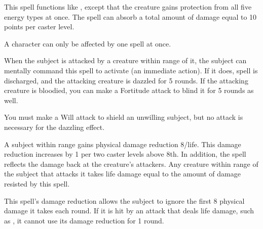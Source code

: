 \begin{spelleffect}
  This spell functions like , except that the creature gains protection from all five energy types at once. The spell can absorb a total amount of damage equal to 10 points per caster level.
\end{spelleffect}
\begin{spellnotes}
  A character can only be affected by one  spell at once.
\end{spellnotes}

\begin{spelleffect}
    When the subject is attacked by a creature within \rngclose range of it, the subject can mentally command this spell to activate (an immediate action). If it does, spell is discharged, and the attacking creature is dazzled for 5 rounds. If the attacking creature is bloodied, you can make a Fortitude attack to blind it for 5 rounds as well.
\end{spelleffect}
\begin{spellnotes}
    You must make a Will attack to shield an unwilling subject, but no attack is necessary for the dazzling effect.
\end{spellnotes}

\spellrng{\rngclose/\rngmed}
\spelldur{\durshort}
\begin{spelleffect}
  A subject within \rngclose range gains physical damage reduction 8/life. This damage reduction increases by 1 per two caster levels above 8th. In addition, the spell reflects the damage back at the creature's attackers. Any creature within \rngmed range of the subject that attacks it takes life damage equal to the amount of damage resisted by this spell.
\end{spelleffect}
\begin{spellnotes}
  This spell's damage reduction allows the subject to ignore the first 8 physical damage it takes each round. If it is hit by an attack that deals life damage, such as , it cannot use its damage reduction for 1 round.
\end{spellnotes}

